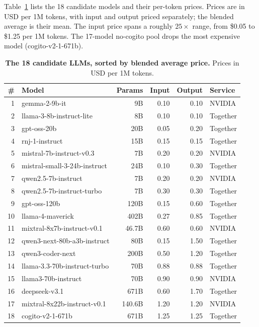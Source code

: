 Table~\ref{tab:app-pricing} lists the 18 candidate models and their per-token prices. Prices are in USD per 1M tokens, with input and output priced separately; the blended average is their mean. The input price spans a roughly $25\times$ range, from \$0.05 to \$1.25 per 1M tokens. The 17-model no-cogito pool drops the most expensive model (cogito-v2-1-671b).

\begin{table}[h]
\centering
\caption{\textbf{The 18 candidate LLMs, sorted by blended average price.} Prices in USD per 1M tokens.}
\label{tab:app-pricing}
\small
\setlength{\tabcolsep}{6pt}
\begin{tabular}{rlrrrl}
\toprule
\textbf{\#} & \textbf{Model} & \textbf{Params} & \textbf{Input} & \textbf{Output} & \textbf{Service} \\
\midrule
1 & gemma-2-9b-it & 9B & 0.10 & 0.10 & NVIDIA \\
2 & llama-3-8b-instruct-lite & 8B & 0.10 & 0.10 & Together \\
3 & gpt-oss-20b & 20B & 0.05 & 0.20 & Together \\
4 & rnj-1-instruct & 15B & 0.15 & 0.15 & Together \\
5 & mistral-7b-instruct-v0.3 & 7B & 0.20 & 0.20 & NVIDIA \\
6 & mistral-small-3-24b-instruct & 24B & 0.10 & 0.30 & Together \\
7 & qwen2.5-7b-instruct & 7B & 0.20 & 0.20 & NVIDIA \\
8 & qwen2.5-7b-instruct-turbo & 7B & 0.30 & 0.30 & Together \\
9 & gpt-oss-120b & 120B & 0.15 & 0.60 & Together \\
10 & llama-4-maverick & 402B & 0.27 & 0.85 & Together \\
11 & mixtral-8x7b-instruct-v0.1 & 46.7B & 0.60 & 0.60 & NVIDIA \\
12 & qwen3-next-80b-a3b-instruct & 80B & 0.15 & 1.50 & Together \\
13 & qwen3-coder-next & 200B & 0.50 & 1.20 & Together \\
14 & llama-3.3-70b-instruct-turbo & 70B & 0.88 & 0.88 & Together \\
15 & llama3-70b-instruct & 70B & 0.90 & 0.90 & NVIDIA \\
16 & deepseek-v3.1 & 671B & 0.60 & 1.70 & Together \\
17 & mixtral-8x22b-instruct-v0.1 & 140.6B & 1.20 & 1.20 & NVIDIA \\
18 & cogito-v2-1-671b & 671B & 1.25 & 1.25 & Together \\
\bottomrule
\end{tabular}
\end{table}

